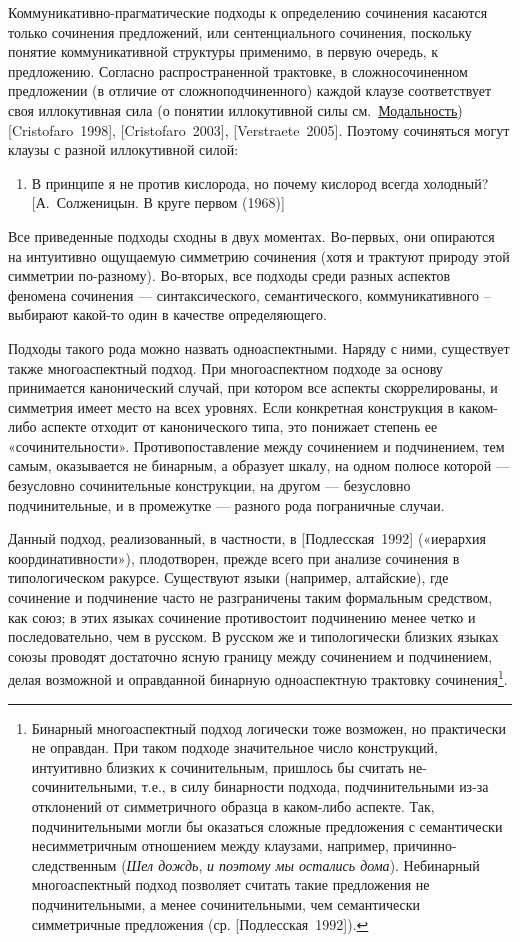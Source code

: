Коммуникативно-прагматические подходы к определению сочинения касаются
только сочинения предложений, или сентенциального сочинения, поскольку
понятие коммуникативной структуры применимо, в первую очередь, к
предложению. Согласно распространенной трактовке, в сложносочиненном
предложении (в отличие от сложноподчиненного) каждой клаузе
соответствует своя иллокутивная сила (о понятии иллокутивной силы
см.~\underline{Модальность}) {[}Cristofaro~1998{]},
{[}Cristofaro~2003{]}, {[}Verstraete~2005{]}. Поэтому сочиняться могут
клаузы с разной иллокутивной силой:

\begin{enumerate}
  \def\labelenumi{(\arabic{enumi})}
  \item
        В принципе я не против кислорода, но почему кислород всегда холодный?
        {[}А.~Солженицын. В круге первом (1968){]}
\end{enumerate}

Все приведенные подходы сходны в двух моментах. Во-первых, они опираются
на интуитивно ощущаемую симметрию сочинения (хотя и трактуют природу
этой симметрии по-разному). Во-вторых, все подходы среди разных аспектов
феномена сочинения --- синтаксического, семантического, коммуникативного
-- выбирают какой-то один в качестве определяющего.

Подходы такого рода можно назвать одноаспектными. Наряду с ними,
существует также многоаспектный подход. При многоаспектном подходе за
основу принимается канонический случай, при котором все аспекты
скоррелированы, и симметрия имеет место на всех уровнях. Если конкретная
конструкция в каком-либо аспекте отходит от канонического типа, это
понижает степень ее «сочинительности». Противопоставление между
сочинением и подчинением, тем самым, оказывается не бинарным, а образует
шкалу, на одном полюсе которой --- безусловно сочинительные конструкции,
на другом --- безусловно подчинительные, и в промежутке --- разного рода
пограничные случаи.

Данный подход, реализованный, в частности, в {[}Подлесская~1992{]}
(«иерархия координативности»), плодотворен, прежде всего при анализе
сочинения в типологическом ракурсе. Существуют языки (например,
алтайские), где сочинение и подчинение часто не разграничены таким
формальным средством, как союз; в этих языках сочинение противостоит
подчинению менее четко и последовательно, чем в русском. В русском же и
типологически близких языках союзы проводят достаточно ясную границу
между сочинением и подчинением, делая возможной и оправданной бинарную
одноаспектную трактовку сочинения\footnote{Бинарный многоаспектный
подход логически тоже возможен, но практически не оправдан. При таком
подходе значительное число конструкций, интуитивно близких к
сочинительным, пришлось бы считать не-сочинительными, т.е., в силу
бинарности подхода, подчинительными из-за отклонений от симметричного
образца в каком-либо аспекте. Так, подчинительными могли бы оказаться
сложные предложения с семантически несимметричным отношением между
клаузами, например, причинно-следственным (\textit{Шел дождь}, \textit{и
  поэтому мы остались дома}). Небинарный многоаспектный подход позволяет
считать такие предложения не подчинительными, а менее сочинительными,
чем семантически симметричные предложения (ср. {[}Подлесская~1992{]}).}.

